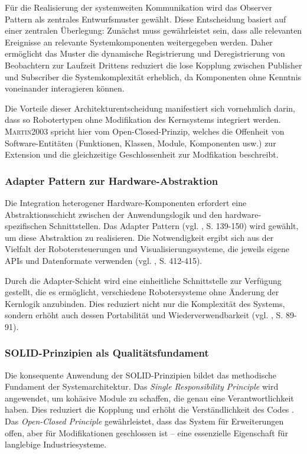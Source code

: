 Für die Realisierung der systemweiten Kommunikation wird das Observer
Pattern als zentrales Entwurfsmuster gewählt. Diese
Entscheidung basiert auf einer zentralen Überlegung: Zunächst muss gewährleistet sein,
dass alle relevanten Ereignisse an relevante Systemkomponenten weitergegeben
werden. Daher ermöglicht das Muster die dynamische Registrierung
und Deregistrierung von Beobachtern zur Laufzeit Drittens
reduziert die lose Kopplung zwischen Publisher und Subscriber die
Systemkomplexität erheblich, da Komponenten ohne Kenntnis voneinander
interagieren können.


Die Vorteile dieser Architekturentscheidung manifestiert sich vornehmlich
darin, dass so Robotertypen ohne Modifikation des Kernsystems integriert
werden. \textsc{Martin2003} spricht hier vom Open-Closed-Prinzip, welches die
Offenheit von Software-Entitäten (Funktionen, Klassen, Module, Komponenten
usw.) zur Extension und die gleichzeitige Geschlossenheit zur Modfikation
beschreibt.

\subsubsection{Adapter Pattern zur Hardware-Abstraktion}
Die Integration heterogener Hardware-Komponenten erfordert eine
Abstraktionsschicht zwischen der Anwendungslogik und den hardware-spezifischen
Schnittstellen. Das Adapter Pattern (vgl. , S. 139-150) wird
gewählt, um diese Abstraktion zu realisieren. Die Notwendigkeit ergibt sich aus
der Vielfalt der Robotersteuerungen und Visualisierungssysteme, die jeweils
eigene APIs und Datenformate verwenden (vgl. , S. 412-415).

Durch die Adapter-Schicht wird eine einheitliche Schnittstelle zur Verfügung
gestellt, die es ermöglicht, verschiedene Robotersysteme ohne Änderung der
Kernlogik anzubinden. Dies reduziert nicht nur die Komplexität des Systems,
sondern erhöht auch dessen Portabilität und Wiederverwendbarkeit (vgl.
, S. 89-91).

\subsubsection{SOLID-Prinzipien als Qualitätsfundament}
Die konsequente Anwendung der SOLID-Prinzipien  bildet das methodische Fundament der Systemarchitektur. Das
\textit{Single Responsibility Principle} wird angewendet, um kohäsive Module zu
schaffen, die genau eine Verantwortlichkeit haben. Dies reduziert die Kopplung
und erhöht die Verständlichkeit des Codes . Das \textit{Open-Closed Principle} gewährleistet, dass das System für
Erweiterungen offen, aber für Modifikationen geschlossen ist – eine essenzielle
Eigenschaft für langlebige Industriesysteme.

